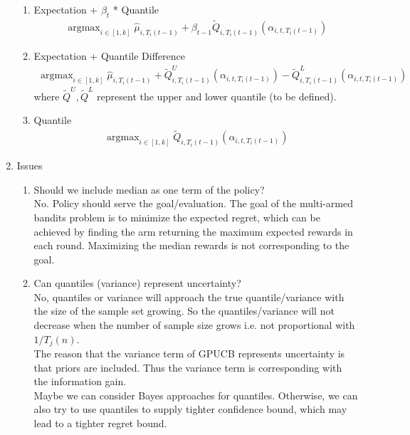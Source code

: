 \documentclass{article}
\DeclareMathOperator*{\argmax}{argmax}
\begin{document}
\begin{enumerate}
\begin{enumerate}
    \item Expectation + $\beta_t$ * Quantile\\
        \begin{align}
        \argmax_{i \in [1,k]} \hat{\mu}_{i,T_i(t-1)} + \beta_{t-1} \tilde{Q}_{i,T_i(t-1)}(\alpha_{i, t, T_i(t-1)})
        \end{align}
       
    \item Expectation + Quantile Difference
    \begin{align}
    \argmax_{i \in [1,k]} \hat{\mu}_{i,T_i(t-1)} +  \tilde{Q}^U_{i,T_i(t-1)}(\alpha_{i, t, T_i(t-1)}) - \tilde{Q}^L_{i,T_i(t-1)}(\alpha_{i, t, T_i(t-1)})
    \end{align}
    where $\tilde{Q}^U, \tilde{Q}^L$ represent the upper and lower quantile (to be defined).
    \item Quantile 
        \begin{align}
        \argmax_{i \in [1,k]} \tilde{Q}_{i,T_i(t-1)}(\alpha_{i, t, T_i(t-1)})
        \end{align}
        
    \end{enumerate}
    
\item Issues

    \begin{enumerate}
    \item Should we include median as one term of the policy?\\
    No. Policy should serve the goal/evaluation. The goal of the multi-armed bandits problem is to minimize the expected regret, which can be achieved by finding the arm returning the maximum expected rewards in each round. Maximizing the median rewards is not corresponding to the goal.
    
    \item Can quantiles (variance) represent uncertainty?\\
    No, quantiles or variance will approach the true quantile/variance with the size of the sample set growing. So the quantiles/variance will not decrease when the number of sample size grows i.e. not proportional with $1/T_j(n)$.\\
    The reason that the variance term of GPUCB represents uncertainty is that priors are included. Thus the variance term is corresponding with the information gain. \\ 
    Maybe we can consider Bayes approaches for quantiles. Otherwise, we can also try to use quantiles to supply tighter confidence bound, which may lead to a tighter regret bound.
    

\end{enumerate}
\end{enumerate}
\end{document}
